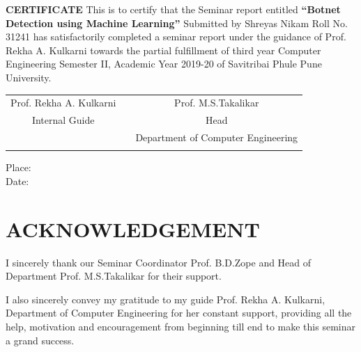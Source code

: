 \documentclass[a4paper, 12pt]{article}
\begin{document}
\begin{titlepage}
\begin{center}
	    \textbf{CERTIFICATE}
	    		\linebreak
	    \linebreak
		This is to certify that the Seminar report entitled
        \linebreak
		\linebreak
		\large
		\textbf{“Botnet Detection using Machine Learning”}
		\linebreak
		\linebreak
		Submitted by
		\linebreak
		Shreyas Nikam \hspace{10mm}   Roll No. 31241 \linebreak
		\linebreak
		has satisfactorily completed a seminar report under the guidance of Prof. Rekha A. Kulkarni  towards the partial fulfillment of third year Computer Engineering Semester II, Academic Year 2019-20 of Savitribai Phule Pune University. 
		\linebreak
		\linebreak
		\linebreak
		\linebreak
		\linebreak
		\begin{table}[h]
		\begin{tabular}{ccc}
		Prof. Rekha A. Kulkarni    &                        &  \hspace{52mm} Prof. M.S.Takalikar\\
		Internal Guide      &                     &    \hspace{52mm} Head \\
		          &                         &       \hspace{47mm} Department of Computer Engineering \\
                    &                       & \hspace{52mm} 
		\end{tabular}
		\end{table}
		\end{center}
Place:\\
Date:

\end{titlepage} 

\section*{ACKNOWLEDGEMENT}

\hspace{0.5cm} I sincerely thank our Seminar Coordinator Prof. B.D.Zope and Head of Department Prof. M.S.Takalikar
for their support.
\vspace{0.25cm}
\par I also sincerely convey my gratitude to my guide Prof. Rekha A. Kulkarni, Department of Computer Engineering for her constant
support, providing all the help, motivation and encouragement from beginning till end to make this seminar a grand success.
\vspace{0.25cm}
\end{document}
